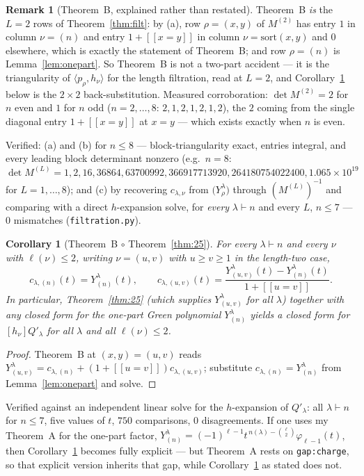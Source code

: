 \documentclass[11pt]{article}
\newtheorem{corollary}[theorem]{Corollary}
\theoremstyle{definition}
\newtheorem{remark}[theorem]{Remark}
\newcommand{\lam}{\lambda}
\newcommand{\Qp}{Q'}
\newcommand{\lb}{[\![}
\newcommand{\rb}{]\!]}
\begin{document}
\begin{remark}[Theorem~B, explained rather than restated]
Theorem~B \emph{is} the $L=2$ rows of Theorem~\ref{thm:filt}: by (a), row $\rho=(x,y)$ of
$M^{(2)}$ has entry $1$ in column $\nu=(n)$ and entry $1+\lb x=y\rb$ in column
$\nu=\mathrm{sort}(x,y)$ and $0$ elsewhere, which is exactly the statement of Theorem~B; and row
$\rho=(n)$ is Lemma~\ref{lem:onepart}. So Theorem~B is not a two-part accident --- it is the
triangularity of $\langle p_\rho,h_\nu\rangle$ for the length filtration, read at $L=2$, and
Corollary~\ref{cor:comp} below is the $2\times2$ back-substitution. Measured corroboration:
$\det M^{(2)}=2$ for $n$ even and $1$ for $n$ odd ($n=2,\dots,8$: $2,1,2,1,2,1,2$), the $2$ coming
from the single diagonal entry $1+\lb x=y\rb$ at $x=y$ --- which exists exactly when $n$ is even.
\end{remark}

\noindent Verified: (a) and (b) for $n\le8$ --- block-triangularity exact, entries integral, and
every leading block determinant nonzero (e.g.\ $n=8$:
$\det M^{(L)}=1,2,16,36864,63700992,366917713920,264180754022400,1.065\!\times\!10^{19}$ for
$L=1,\dots,8$); and (c) by recovering $c_{\lam,\nu}$ from $\bigl(Y^\lam_\rho\bigr)$ through
$(M^{(L)})^{-1}$ and comparing with a direct $h$-expansion solve, for \emph{every} $\lam\vdash n$
and every $L$, $n\le7$ --- $0$ mismatches (\texttt{filtration.py}).

\begin{corollary}[Theorem~B $\circ$ Theorem~\ref{thm:25}]\label{cor:comp}
For every $\lam\vdash n$ and every $\nu$ with $\ell(\nu)\le2$, writing $\nu=(u,v)$ with
$u\ge v\ge1$ in the length-two case,
\[
  c_{\lam,(n)}(t)=Y^{\lam}_{(n)}(t),\qquad
  c_{\lam,(u,v)}(t)=\frac{Y^{\lam}_{(u,v)}(t)-Y^{\lam}_{(n)}(t)}{1+\lb u=v\rb}.
\]
In particular, Theorem~\ref{thm:25} (which supplies $Y^\lam_{(u,v)}$ for all $\lam$) together with
any closed form for the one-part Green polynomial $Y^\lam_{(n)}$ yields a closed form for
$[h_\nu]\Qp_\lam$ for \emph{all} $\lam$ and all $\ell(\nu)\le2$.
\end{corollary}
\begin{proof}
Theorem~B at $(x,y)=(u,v)$ reads
$Y^\lam_{(u,v)}=c_{\lam,(n)}+(1+\lb u=v\rb)c_{\lam,(u,v)}$; substitute
$c_{\lam,(n)}=Y^\lam_{(n)}$ from Lemma~\ref{lem:onepart} and solve.
\end{proof}

\noindent Verified against an independent linear solve for the $h$-expansion of $\Qp_\lam$: all
$\lam\vdash n$ for $n\le7$, five values of $t$, $750$ comparisons, $0$ disagreements.
If one uses my Theorem~A for the one-part factor,
$Y^\lam_{(n)}=(-1)^{\ell-1}t^{\,n(\lam)-\binom{\ell}{2}}\varphi_{\ell-1}(t)$, then
Corollary~\ref{cor:comp} becomes fully explicit --- but Theorem~A rests on
\texttt{gap:charge}, so that explicit version inherits that gap, while
Corollary~\ref{cor:comp} as stated does not.
\end{document}
